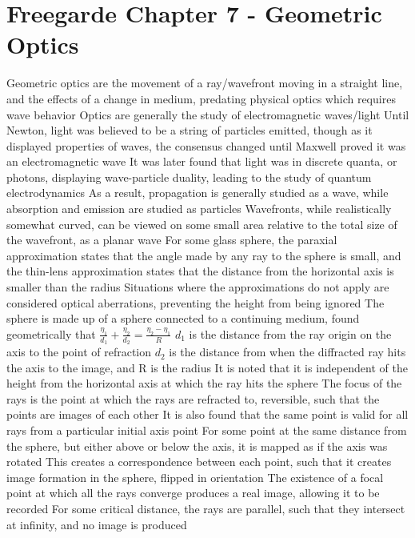 \documentclass[11 pt, twoside]{article}
\newenvironment{outline*}
{
	\begin{outline}[enumerate]
	}
	{\end{outline}
}
\begin{document}
\section{Freegarde Chapter 7 - Geometric Optics}
\begin{outline*}
\1 Geometric optics are the movement of a ray/wavefront moving in a straight line, and the effects of a change in medium, predating physical optics which requires wave behavior
\2 Optics are generally the study of electromagnetic waves/light
\2 Until Newton, light was believed to be a string of particles emitted, though as it displayed properties of waves, the consensus changed until Maxwell proved it was an electromagnetic wave
\3 It was later found that light was in discrete quanta, or photons, displaying wave-particle duality, leading to the study of quantum electrodynamics
\3 As a result, propagation is generally studied as a wave, while absorption and emission are studied as particles
\2 Wavefronts, while realistically somewhat curved, can be viewed on some small area relative to the total size of the wavefront, as a planar wave
\1 For some glass sphere, the paraxial approximation states that the angle made by any ray to the sphere is small, and the thin-lens approximation states that the distance from the horizontal axis is smaller than the radius
\2 Situations where the approximations do not apply are considered optical aberrations, preventing the height from being ignored
\2 The sphere is made up of a sphere connected to a continuing medium, found geometrically that $\frac{\eta_1}{d_1} + \frac{\eta_2}{d_2} = \frac{\eta_2 - \eta_1}{R}$
\3 $d_1$ is the distance from the ray origin on the axis to the point of refraction $d_2$ is the distance from when the diffracted ray hits the axis to the image, and R is the radius
\3 It is noted that it is independent of the height from the horizontal axis at which the ray hits the sphere
\3 The focus of the rays is the point at which the rays are refracted to, reversible, such that the points are images of each other
\3 It is also found that the same point is valid for all rays from a particular initial axis point
\2 For some point at the same distance from the sphere, but either above or below the axis, it is mapped as if the axis was rotated
\3 This creates a correspondence between each point, such that it creates image formation in the sphere, flipped in orientation
\2 The existence of a focal point at which all the rays converge produces a real image, allowing it to be recorded
\3 For some critical distance, the rays are parallel, such that they intersect at infinity, and no image is produced

\end{outline*}
\end{document}
